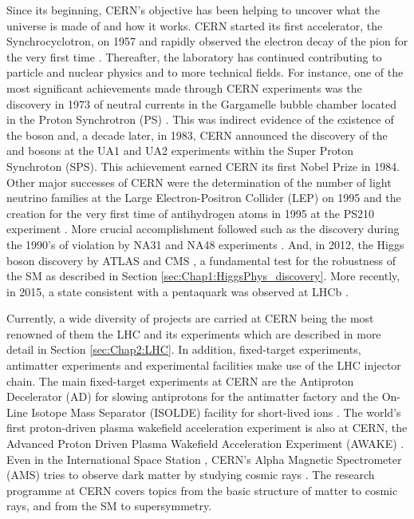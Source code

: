 Since its beginning, CERN's objective has been helping to uncover what the universe is made of and how it works.
CERN started its first accelerator, the Synchrocyclotron, on 1957 and rapidly observed the electron decay
of the pion for the very first time \cite{PhysRevLett.1.247}. Thereafter, the laboratory has continued contributing
to particle and nuclear physics and to more technical fields.%
 For instance, one of the most significant achievements made through CERN experiments 
 was the discovery in 1973 of neutral currents in the Gargamelle bubble chamber located 
 in the Proton Synchrotron (PS) \cite{HASERT1973138}. This was indirect evidence of the 
 existence of the \PZ boson and, a decade later, in 1983, CERN announced the discovery 
 of the \PZ and \PW bosons \cite{doi:10.1080/00107518608211015} at the UA1 and UA2 
 experiments within the Super Proton Synchroton (SPS). This achievement earned CERN 
 its first Nobel Prize in 1984.
Other major successes of CERN were the determination of the number of light neutrino families  at the Large Electron-Positron  %
Collider (LEP) on 1995 \cite{DECAMP1989519} and the creation for the very first time of antihydrogen atoms in 1995 at the PS210 
experiment \cite{BAUR1996251}. 
More crucial accomplishment followed such as the discovery during the 1990's of \CP violation by NA31 \cite{BARR1993233_NA31} 
and NA48 experiments \cite{1999335NA48}. 
And, in 2012, the Higgs boson discovery by ATLAS and CMS\cite{20121_ATLAS_HiggsDiscovery} 
\cite{201230_CMS_HiggsDiscovery}, a fundamental test for the robustness of the SM as described in Section \ref{sec:Chap1:HiggsPhys_discovery}. 
More recently, in 2015, a state consistent with a pentaquark was observed at LHCb \cite{LHCb:2015yax}. 


Currently, a wide diversity of projects are carried at CERN being the most renowned of them the LHC and its experiments which 
are described in more detail in Section \ref{sec:Chap2:LHC}. In addition, fixed-target experiments, antimatter experiments and experimental 
facilities make use of the LHC injector chain. The main fixed-target experiments at CERN are the Antiproton Decelerator
(AD) \cite{Maury:1997lnx} for slowing antiprotons for the antimatter factory \cite{Alemany:2019vsk} and the On-Line Isotope Mass Separator 
(ISOLDE) facility for short-lived ions \cite{Catherall_2017}. The world's first proton-driven plasma wakefield acceleration experiment is
also at CERN, the Advanced Proton Driven Plasma Wakefield Acceleration Experiment (AWAKE) \cite{Awake_201676}. Even in the International
Space Station , CERN's Alpha Magnetic Spectrometer (AMS) tries to observe dark matter by studying cosmic rays \cite{AGUILAR2002331}. 
The research programme at CERN covers topics from the basic structure of matter 
to cosmic rays, and from the SM to supersymmetry. 

